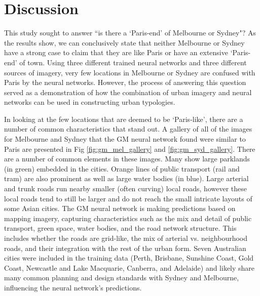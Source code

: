 \documentclass[10pt,letterpaper]{article}
\begin{document}
\section*{Discussion}\label{sec:discussion}
This study sought to answer ``is there a `Paris-end' of Melbourne or Sydney"? As the results show, we can conclusively state that neither Melbourne or Sydney have a strong case to claim that they are like Paris or have an extensive `Paris-end' of town. Using three different trained neural networks and three different sources of imagery, very few locations in Melbourne or Sydney are confused with Paris by the neural networks. However, the process of answering this question served as a demonstration of how the combination of urban imagery and neural networks can be used in constructing urban typologies.



In looking at the few locations that are deemed to be `Paris-like', there are a number of common characteristics that stand out. A gallery of all of the images for Melbourne and Sydney that the GM neural network found were similar to Paris are presented in Fig \ref{fig:gm_mel_gallery} and \ref{fig:gm_syd_gallery}. There are a number of common elements in these images. Many show large parklands (in green) embedded in the cities. Orange lines of public transport (rail and tram) are also prominent as well as large water bodies (in blue). Large arterial and trunk roads run nearby smaller (often curving) local roads, however these local roads tend to still be larger and do not reach the small intricate layouts of some Asian cities. The GM neural network is making predictions based on mapping imagery, capturing characteristics such as the mix and detail of public transport, green space, water bodies, and the road network structure. This includes whether the roads are grid-like, the mix of arterial vs. neighbourhood roads, and their integration with the rest of the urban form. Seven Australian cities were included in the training data (Perth, Brisbane, Sunshine Coast, Gold Coast, Newcastle and Lake Macquarie, Canberra, and Adelaide) and likely share many common planning and design standards with Sydney and Melbourne, influencing the neural network's predictions. 
\end{document}
